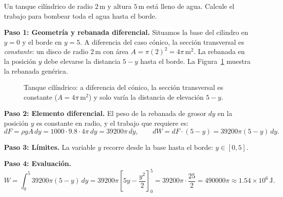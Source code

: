 \begin{example}
Un tanque cilíndrico de radio $2\,\text{m}$ y altura $5\,\text{m}$ está
lleno de agua. Calcule el trabajo para bombear toda el agua hasta el borde.

\begin{myproof}
\textbf{Paso 1: Geometría y rebanada diferencial.}
Situamos la base del cilindro en $y=0$ y el borde en $y=5$. A diferencia
del caso cónico, la sección transversal es \emph{constante}: un disco de
radio $2\,\text{m}$ con área $A=\pi(2)^2=4\pi\,\text{m}^2$. La rebanada
en la posición $y$ debe elevarse la distancia $5-y$ hasta el borde.
La Figura~\ref{fig:trabajo_tanque_cilindrico} muestra la rebanada genérica.

\begin{figure}[H]
\centering
{}
\caption{Tanque cilíndrico: a diferencia del cónico, la sección transversal es constante ($A=4\pi\,\text{m}^2$) y solo varía la distancia de elevación $5-y$.}
\label{fig:trabajo_tanque_cilindrico}
\end{figure}

\textbf{Paso 2: Elemento diferencial.}
El peso de la rebanada de grosor $dy$ en la posición $y$ es constante en
radio, y el trabajo que requiere es:
\[
  dF = \rho g A\,dy = 1000\cdot9.8\cdot4\pi\,dy = 39200\pi\,dy,
  \qquad
  dW = dF\cdot(5-y) = 39200\pi(5-y)\,dy.
\]

\textbf{Paso 3: Límites.}
La variable $y$ recorre desde la base hasta el borde: $y\in[0,5]$.

\textbf{Paso 4: Evaluación.}
\[
  W = \int_0^5 39200\pi(5-y)\,dy
    = 39200\pi\left[5y-\frac{y^2}{2}\right]_0^5
    = 39200\pi\cdot\frac{25}{2}
    = \boxed{490000\pi\approx 1.54\times10^6\,\text{J}}.
\]
\end{myproof}
\end{example}


